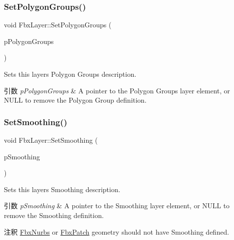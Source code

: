 \subsubsection{\texorpdfstring{Set\+Polygon\+Groups()}{SetPolygonGroups()}}
{\footnotesize\ttfamily void Fbx\+Layer\+::\+Set\+Polygon\+Groups (\begin{DoxyParamCaption}\item[{\hyperlink{class_fbx_layer_element_polygon_group}{Fbx\+Layer\+Element\+Polygon\+Group} $\ast$}]{p\+Polygon\+Groups }\end{DoxyParamCaption})}

Sets this layer\textquotesingle{}s Polygon Groups description. 
\begin{DoxyParams}{引数}
{\em p\+Polygon\+Groups} & A pointer to the Polygon Groups layer element, or {\ttfamily N\+U\+LL} to remove the Polygon Group definition. \\
\hline
\end{DoxyParams}
\mbox{\label{class_fbx_layer_af8687e2d32aa26d65ca3daf942f0e21b}} 
\subsubsection{\texorpdfstring{Set\+Smoothing()}{SetSmoothing()}}
{\footnotesize\ttfamily void Fbx\+Layer\+::\+Set\+Smoothing (\begin{DoxyParamCaption}\item[{\hyperlink{class_fbx_layer_element_smoothing}{Fbx\+Layer\+Element\+Smoothing} $\ast$}]{p\+Smoothing }\end{DoxyParamCaption})}

Sets this layer\textquotesingle{}s Smoothing description. 
\begin{DoxyParams}{引数}
{\em p\+Smoothing} & A pointer to the Smoothing layer element, or {\ttfamily N\+U\+LL} to remove the Smoothing definition. \\
\hline
\end{DoxyParams}
\begin{DoxyRemark}{注釈}
\hyperlink{class_fbx_nurbs}{Fbx\+Nurbs} or \hyperlink{class_fbx_patch}{Fbx\+Patch} geometry should not have Smoothing defined. 
\end{DoxyRemark}
\mbox{\label{class_fbx_layer_a779a440235a9d059e57464368025e3b0}} 
